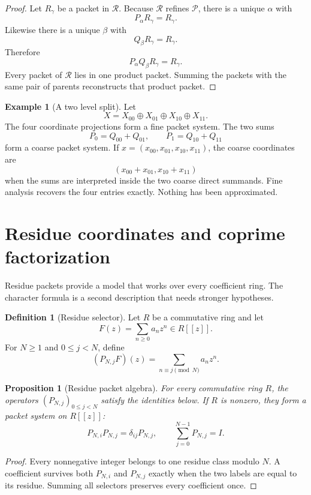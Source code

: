 \documentclass[11pt,a4paper]{article}
\newtheorem{proposition}[proposition]{Proposition}
\theoremstyle{definition}
\newtheorem{definition}[definition]{Definition}
\newtheorem{example}[example]{Example}
\theoremstyle{remark}
\newcommand{\Pcal}{\mathcal P}
\newcommand{\Rcal}{\mathcal R}
\theoremstyle{definition}\newtheorem{construction}[theorem]{Construction}\newtheorem{certificate}[theorem]{Numerical Certificate}
\theoremstyle{remark}\newtheorem{boundary}[theorem]{Boundary}
\begin{document}
\begin{proof}
Let $R_\gamma$ be a packet in $\Rcal$.  Because $\Rcal$ refines $\Pcal$, there is a unique $\alpha$ with
\[
P_\alpha R_\gamma=R_\gamma.
\]
Likewise there is a unique $\beta$ with
\[
Q_\beta R_\gamma=R_\gamma.
\]
Therefore
\[
P_\alpha Q_\beta R_\gamma=R_\gamma.
\]
Every packet of $\Rcal$ lies in one product packet.  Summing the packets with the same pair of parents reconstructs that product packet.
\end{proof}

\begin{example}[A two level split]\label{ex:two_level_split}
Let
\[
X=X_{00}\oplus X_{01}\oplus X_{10}\oplus X_{11}.
\]
The four coordinate projections form a fine packet system.  The two sums
\[
P_0=Q_{00}+Q_{01},
\qquad
P_1=Q_{10}+Q_{11}
\]
form a coarse packet system.  If $x=(x_{00},x_{01},x_{10},x_{11})$, the coarse coordinates are
\[
(x_{00}+x_{01},x_{10}+x_{11})
\]
when the sums are interpreted inside the two coarse direct summands.  Fine analysis recovers the four entries exactly.  Nothing has been approximated.
\end{example}

\section{Residue coordinates and coprime factorization}\label{sec:residue}

Residue packets provide a model that works over every coefficient ring.  The character formula is a second description that needs stronger hypotheses.

\begin{definition}[Residue selector]\label{def:residue_selector}
Let $R$ be a commutative ring and let
\[
F(z)=\sum_{n\geq0}a_nz^n\in R[[z]].
\]
For $N\geq1$ and $0\leq j<N$, define
\[
(P_{N,j}F)(z)
=
\sum_{n\equiv j\pmod N}a_nz^n.
\]
\end{definition}

\begin{proposition}[Residue packet algebra]\label{prop:residue_algebra}\label{prop:residue-algebra}
For every commutative ring $R$, the operators $(P_{N,j})_{0\leq j<N}$ satisfy the identities below.  If $R$ is nonzero, they form a packet system on $R[[z]]$:
\[
P_{N,i}P_{N,j}=\delta_{ij}P_{N,j},
\qquad
\sum_{j=0}^{N-1}P_{N,j}=I.
\]
\end{proposition}

\begin{proof}
Every nonnegative integer belongs to one residue class modulo $N$.  A coefficient survives both $P_{N,i}$ and $P_{N,j}$ exactly when the two labels are equal to its residue.  Summing all selectors preserves every coefficient once.
\end{proof}
\end{document}
